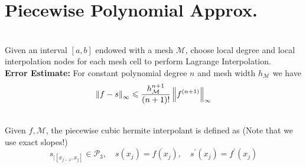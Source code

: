 \begin{comment}
# Trigonometric Approximation (For periodic Signals)

## Error Estimate
-> smoothness leads to faster convergence
-> Every function has a Fourrier Series?

- L2-Norm of Fourrier Series given by sum of coefficients square
- Fourier modes higner than n can be distinguished when only sampling n points, hence they all get mapped to their modulo.
  -> The coeffiences are the sum of all higher multiples.
  
Now to continue on the search for an error estimate, need decay law for Fourrier:
 ->The smoother a periodic function the faster the decay of its Fourier coefficients decay in O(xxx) 6.5.2.20
 
 -> Main Result: algebraic convergenceof theL2-norm of the trigonometric interpolation error forfunctions withlimited smoothness
 
 ## Analytic Functions
 -> exponential convergence
 -> exponential decay of Fourrier coeffs.
 -> The larger the strip of analiticity the beter.
 
 Seems important, why fourrier coefficient equal integral over 0, 1? 4.2.6.20 -> its simply the projection of the function on that vector!
 Write entry in summary about fourrier Series!
\end{comment}


\section{Piecewise Polynomial Approx.}

 \\
Given an interval $[a,b]$ endowed with a mesh $\mathcal{M}$, choose local degree and local interpolation nodes for each mesh cell to perform Lagrange Interpolation. \\
\textbf{Error Estimate:} For constant polynomial degree $n$ and mesh width $h_\mathcal{M}$ we have
$$\left\lVert f-s \right\rVert_\infty \leqslant \frac{h_{\mathcal{M}}^{n+1}}{(n+1) !}\left\lVert f^{(n+1)} \right\rVert_\infty$$ 


 \\
Given $f, \mathcal{M}$, the piecewise cubic hermite interpolant is defined as (Note that we use exact slopes!)
$$
s_{\mid\left[x_{j-1}, x_{j}\right]} \in \mathcal{P}_{3}, \quad s\left(x_{j}\right)=f\left(x_{j}\right), \quad s^{\prime}\left(x_{j}\right)=f^{\prime}\left(x_{j}\right)
$$ 

\begin{comment}
 
 ## Spline
  - Convergence in O(h^4)
 Spline vs Hermite?
 
 # Do a subsection on Best approximation Error
 algebraic for limited smoothness
 exponential convergence for analytic functions

6.2.2.15 give it more merit

Remaining: 
- Pullback 

## Error bounds
chebychev bound on analytic functions convergence?

\end{comment}


 
 
